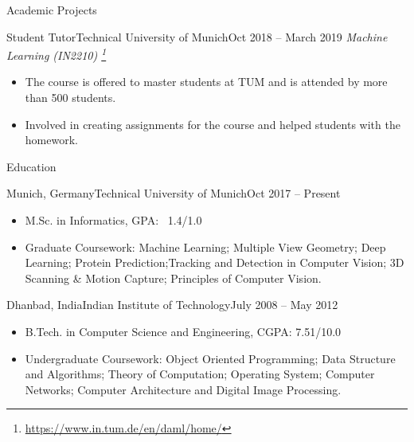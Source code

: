 \documentclass[]{mcdowellcv}
\begin{document}
\begin{cvsection}{Academic Projects}
    \begin{cvsubsection}{Student Tutor}{Technical University of Munich}{Oct 2018 -- March 2019}    
        \textit{Machine Learning (IN2210) \footnote{\href{https://www.in.tum.de/en/daml/home/}{https://www.in.tum.de/en/daml/home/}}}
            \begin{itemize}
                \item The course is offered to master students at TUM and is attended by more than 500 students. 
                \item Involved in creating assignments for the course and helped students with the homework. 
            \end{itemize}
        \end{cvsubsection}
    
    \end{cvsection}

    \begin{cvsection}{Education}
        \begin{cvsubsection}{Munich, Germany}{Technical University of Munich}{Oct 2017 -- Present}
            \begin{itemize}
                \item M.Sc. in Informatics, GPA: ~1.4/1.0
                \item Graduate Coursework: Machine Learning; Multiple View Geometry; Deep Learning; Protein Prediction;Tracking and Detection in Computer Vision; 3D Scanning \& Motion Capture; Principles of Computer Vision.
            \end{itemize}
        \end{cvsubsection}
        \begin{cvsubsection}{Dhanbad, India}{Indian Institute of Technology}{July 2008 -- May 2012}
            \begin{itemize}
                \item B.Tech. in Computer Science and Engineering,  CGPA: 7.51/10.0
                \item Undergraduate Coursework: Object Oriented Programming; Data Structure and Algorithms; Theory of Computation; Operating System; Computer Networks; Computer Architecture and Digital Image Processing.
            \end{itemize}
        \end{cvsubsection}
    \end{cvsection}
    
\end{document}
